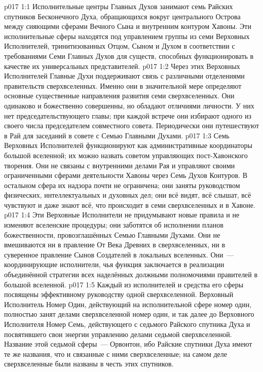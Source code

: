 \vs p017 1:1 Исполнительные центры Главных Духов занимают семь Райских спутников Бесконечного Духа, обращающихся вокруг центрального Острова между сияющими сферами Вечного Сына и внутренним контуром Хавоны. Эти исполнительные сферы находятся под управлением группы из семи Верховных Исполнителей, тринитизованных Отцом, Сыном и Духом в соответствии с требованиями Семи Главных Духов для существ, способных функционировать в качестве их универсальных представителей.
\vs p017 1:2 Через этих Верховных Исполнителей Главные Духи поддерживают связь с различными отделениями правительств сверхвселенных. Именно они в значительной мере определяют основные существенные направления развития семи сверхвселенных. Они одинаково и божественно совершенны, но обладают отличиями личности. У них нет председательствующего главы; при каждой встрече они избирают одного из своего числа председателем совместного совета. Периодически они путешествуют в Рай для заседаний в совете с Семью Главными Духами.
\vs p017 1:3 \pc Семь Верховных Исполнителей функционируют как административные координаторы большой вселенной; их можно назвать советом управляющих пост\hyp{}Хавонского творения. Они не связаны с внутренними делами Рая и управляют своими ограниченными сферами деятельности Хавоны через Семь Духов Контуров. В остальном сфера их надзора почти не ограничена; они заняты руководством физических, интеллектуальных и духовных дел; они всё видят, всё слышат, всё чувствуют и даже знают всё, что происходит в семи сверхвселенных и в Хавоне.
\vs p017 1:4 Эти Верховные Исполнители не придумывают новые правила и не изменяют вселенские процедуры; они заботятся об исполнении планов божественности, провозглашённых Семью Главными Духами. Они не вмешиваются ни в правление От Века Древних в сверхвселенных, ни в суверенное правление Сынов Создателей в локальных вселенных. Они~--- координирующие исполнители, чья функция заключается в реализации объединённой стратегии всех наделённых должными полномочиями правителей в большой вселенной.
\vs p017 1:5 Каждый из исполнителей и средства его сферы посвящены эффективному руководству одной сверхвселенной. Верховный Исполнитель Номер Один, действующий на исполнительной сфере номер один, полностью занят делами сверхвселенной номер один, и так далее до Верховного Исполнителя Номер Семь, действующего с седьмого Райского спутника Духа и посвятившего свои энергии управлению делами седьмой сверхвселенной. Название этой седьмой сферы~--- Орвонтон, ибо Райские спутники Духа имеют те же названия, что и связанные с ними сверхвселенные; на самом деле сверхвселенные были названы в честь этих спутников.
